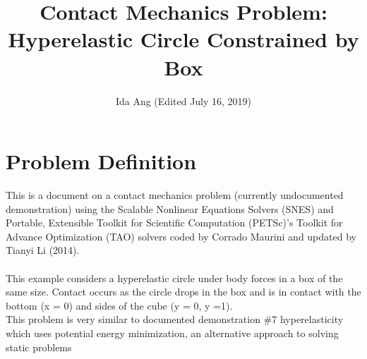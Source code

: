 \documentclass[12pt,3p]{article}
\begin{document}
\title{Contact Mechanics Problem: Hyperelastic Circle Constrained by Box}
\author{Ida Ang (Edited July 16, 2019)}
\date{\vspace{-5ex}}
\maketitle

\section{Problem Definition}
This is a document on a contact mechanics problem (currently undocumented demonstration) using the Scalable Nonlinear Equations Solvers (SNES) and Portable, Extensible Toolkit for Scientific Computation (PETSc)'s Toolkit for Advance Optimization (TAO) solvers coded by Corrado Maurini and updated by Tianyi Li (2014).  \\ \\
This example considers a hyperelastic circle under body forces in a box of the same size. Contact occurs as the circle drops in the box and is in contact with the bottom (x = 0) and sides of the cube (y = 0, y =1). \\
This problem is very similar to documented demonstration \#7 hyperelasticity which uses potential energy minimization, an alternative approach to solving static problems 
\end{document}

